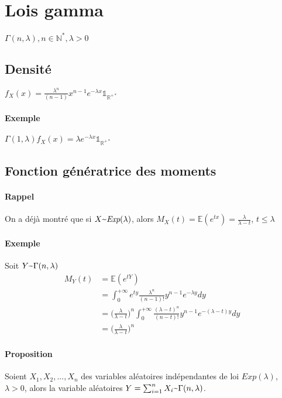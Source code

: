 \documentclass{article}
\newcommand{\textapprox}{\raisebox{0.5ex}{\texttildelow}}
\begin{document}
\section{Lois gamma}

$\Gamma(n,\lambda), n \in \mathbb{N}^*, \lambda > 0$

\subsection{Densité}

$ f_X(x) = \frac{\lambda^n}{(n-1)} x^{n-1}e^{- \lambda x} \mathds{1}_{\mathbb{R}^{+*}}$

\paragraph{Exemple} $ \Gamma(1, \lambda) f_X(x) = \lambda e^{- \lambda x} \mathds{1}_{\mathbb{R}^{+*}} $

\subsection{Fonction génératrice des moments}

\paragraph{Rappel } On a déjà montré que si $X \textapprox \textit{Exp}(\lambda)$, alors
$ M_X(t) = \mathbb{E}(e^{tx}) = \frac{\lambda}{\lambda - t} $, $ t \leq \lambda $

\paragraph{Exemple}
Soit $Y \textapprox \Gamma (n, \lambda)$
\begin{align*}
  M_Y(t) &= \mathbb{E}(e^{tY}) \\
  &= \int_0^{+ \infty} e^{ty} \frac{\lambda^n}{(n-1)!} y^{n-1} e^{- \lambda y} dy \\
  &= \Big( \frac{\lambda}{\lambda - t} \Big)^n \int_0^{+ \infty} \frac{(\lambda - t)^n}{(n-t)!} y^{n-1} e^{-(\lambda -t)y}dy \\
  &= \Big( \frac{\lambda}{\lambda - t} \Big)^n
\end{align*}

\paragraph{Proposition}
Soient $X_1, X_2, ..., X_n$ des variables aléatoires indépendantes de loi $\textit{Exp}(\lambda)$, $\lambda > 0$, alors la variable aléatoires $Y = \sum_{i = 1}^n X_i \textapprox \Gamma(n, \lambda)$.
\end{document}
